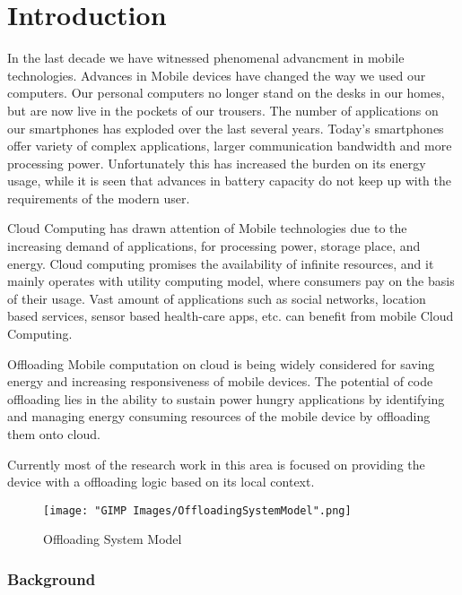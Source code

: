 \documentclass[12pt]{report}
\begin{document}

\chapter{Introduction} %
In the last decade we have witnessed phenomenal advancment in mobile technologies. Advances in Mobile devices have changed the way we used our computers. Our personal computers no longer stand on the desks in our homes, but are now live in the pockets of our trousers. The number of applications on our smartphones has exploded over the last several years.
Today's smartphones offer variety of complex applications, larger communication bandwidth and more processing power. Unfortunately this has increased the burden on its energy usage, while it is seen that advances in battery capacity do not keep up with the requirements of the modern user.

Cloud Computing has drawn attention of Mobile technologies due to the increasing demand of applications, for processing power, storage place, and energy. Cloud computing promises the availability of infinite resources, and it mainly operates with utility computing model, where consumers pay on the basis of their usage. Vast amount of applications such as social networks, location based services, sensor based health-care apps, etc. can benefit from mobile Cloud Computing.

Offloading Mobile computation on cloud is being widely considered for saving energy and increasing responsiveness of mobile devices.
The potential of code offloading lies in the ability to sustain power hungry applications by identifying and managing energy consuming resources of the mobile device by offloading them onto cloud. 

Currently most of the research work in this area is focused on providing the device with a offloading logic based on its local context.

\begin{figure}[h]
  \centering
  \texttt{[image: "GIMP Images/OffloadingSystemModel".png]}
  \caption{Offloading System Model}
  \label{fig:OffloadingSystemModel}
\end{figure}
\subsection{Background}
\end{document}
